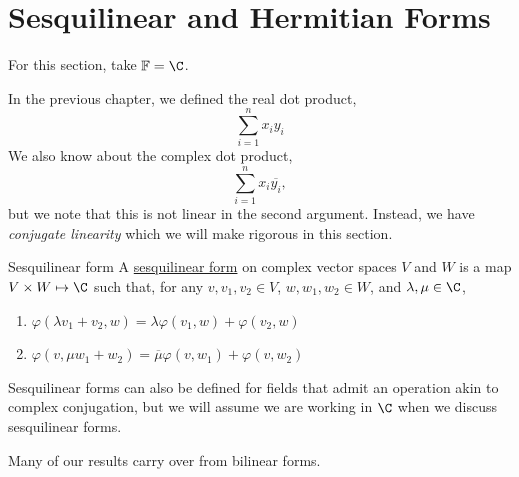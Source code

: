 \documentclass[../Main.tex]{subfiles}
\begin{document}
\section{Sesquilinear and Hermitian Forms}
For this section, take $\F = \C$.
\begin{example}
    In the previous chapter, we defined the real dot product,
    \begin{equation*}
        \sum_{i = 1}^n x_i y_i
    \end{equation*}
    We also know about the complex dot product,
    \begin{equation*}
        \sum_{i=1}^{n} x_i \overline{y_i},
    \end{equation*}
    but we note that this is not linear in the second argument. Instead, we have \textit{conjugate linearity} which we will make rigorous in this section.
\end{example}
\begin{definition}{Sesquilinear form}
    A \underline{sesquilinear form} on complex vector spaces $V$ and $W$ is a map $V \times W \mapsto \C$ such that, for any $v, v_1, v_2 \in V$, $w, w_1, w_2 \in W$, and $\lambda, \mu \in \C$,
    \begin{enumerate}
        \item $\varphi(\lambda v_1 + v_2, w) = \lambda \varphi(v_1, w) + \varphi(v_2, w)$
        \item $\varphi(v, \mu w_1 + w_2) = \overline{\mu} \varphi(v, w_1) + \varphi(v, w_2)$
    \end{enumerate}
\end{definition}
\begin{remark}
    Sesquilinear forms can also be defined for fields that admit an operation akin to complex conjugation, but we will assume we are working in $\C$ when we discuss sesquilinear forms.
\end{remark}
Many of our results carry over from bilinear forms.
\end{document}
